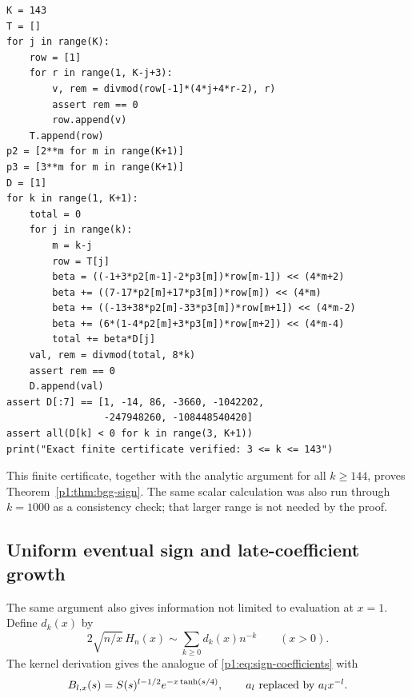 \documentclass[11pt,a4paper]{article}
\theoremstyle{definition}
\theoremstyle{remark}
\numberwithin{equation}{section}
\begin{document}
\begin{lstlisting}
K = 143
T = []
for j in range(K):
    row = [1]
    for r in range(1, K-j+3):
        v, rem = divmod(row[-1]*(4*j+4*r-2), r)
        assert rem == 0
        row.append(v)
    T.append(row)
p2 = [2**m for m in range(K+1)]
p3 = [3**m for m in range(K+1)]
D = [1]
for k in range(1, K+1):
    total = 0
    for j in range(k):
        m = k-j
        row = T[j]
        beta = ((-1+3*p2[m-1]-2*p3[m])*row[m-1]) << (4*m+2)
        beta += ((7-17*p2[m]+17*p3[m])*row[m]) << (4*m)
        beta += ((-13+38*p2[m]-33*p3[m])*row[m+1]) << (4*m-2)
        beta += (6*(1-4*p2[m]+3*p3[m])*row[m+2]) << (4*m-4)
        total += beta*D[j]
    val, rem = divmod(total, 8*k)
    assert rem == 0
    D.append(val)
assert D[:7] == [1, -14, 86, -3660, -1042202,
                 -247948260, -108448540420]
assert all(D[k] < 0 for k in range(3, K+1))
print("Exact finite certificate verified: 3 <= k <= 143")
\end{lstlisting}

This finite certificate, together with the analytic argument for all
$k\geq144$, proves Theorem~\ref{p1:thm:bgg-sign}. The same scalar
calculation was also run through $k=1000$ as a consistency check;
that larger range is not needed by the proof.

\subsection{Uniform eventual sign and late-coefficient growth}

The same argument also gives information not limited to evaluation at
$x=1$. Define $d_k(x)$ by
\[
 2\sqrt{n/x}\,H_n(x)\sim\sum_{k\geq0}d_k(x)n^{-k}
 \qquad(x>0).
\]
The kernel derivation gives the analogue of
\eqref{p1:eq:sign-coefficients} with
\[
 B_{l,x}(s)=S(s)^{l-1/2}e^{-x\tanh(s/4)},\qquad
 a_l\ \hbox{replaced by}\ a_lx^{-l}.
\]
\end{document}
